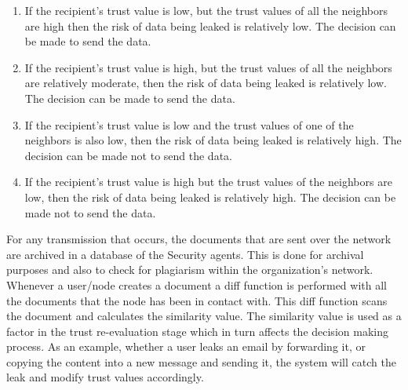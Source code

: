 \begin{enumerate}
    \item If the recipient’s trust value is low, but the trust values of all the
        neighbors are high then the risk of data being leaked is relatively low. The
        decision can be made to send the data.
    \item If the recipient’s trust value is high, but the trust values of all the
        neighbors are relatively moderate, then the risk of data being leaked is
        relatively low. The decision can be made to send the data.
    \item If the recipient’s trust value is low and the trust values of one of the
        neighbors is also low, then the risk of data being leaked is relatively
        high. The decision can be made not to send the data.
    \item If the recipient’s trust value is high but the trust values of the neighbors
are low, then the risk of data being leaked is relatively high. The decision
can be made not to send the data.  
\end{enumerate}
For any transmission that occurs, the
documents that are sent over the network are archived in a database of the
Security agents. This is done for archival purposes and also to check for
plagiarism within the organization’s network. Whenever a user/node creates
a document a diff function is performed with all the documents that the node
has been in contact with. This diff function scans the document and
calculates the similarity value. The similarity value is used as a factor in
the trust re-evaluation stage which in turn affects the decision making
process. As an example, whether a user leaks an email by forwarding it, or
copying the content into a new message and sending it, the system will catch
the leak and modify trust values accordingly.

